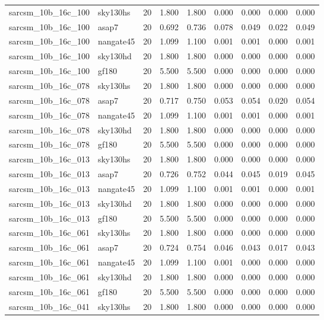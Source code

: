 \begin{tabular}{llrrrrrrr}
sarcsm\_10b\_16c\_100 & sky130hs & 20 & 1.800 & 1.800 & 0.000 & 0.000 & 0.000 & 0.000 \\
sarcsm\_10b\_16c\_100 & asap7 & 20 & 0.692 & 0.736 & 0.078 & 0.049 & 0.022 & 0.049 \\
sarcsm\_10b\_16c\_100 & nangate45 & 20 & 1.099 & 1.100 & 0.001 & 0.001 & 0.000 & 0.001 \\
sarcsm\_10b\_16c\_100 & sky130hd & 20 & 1.800 & 1.800 & 0.000 & 0.000 & 0.000 & 0.000 \\
sarcsm\_10b\_16c\_100 & gf180 & 20 & 5.500 & 5.500 & 0.000 & 0.000 & 0.000 & 0.000 \\
sarcsm\_10b\_16c\_078 & sky130hs & 20 & 1.800 & 1.800 & 0.000 & 0.000 & 0.000 & 0.000 \\
sarcsm\_10b\_16c\_078 & asap7 & 20 & 0.717 & 0.750 & 0.053 & 0.054 & 0.020 & 0.054 \\
sarcsm\_10b\_16c\_078 & nangate45 & 20 & 1.099 & 1.100 & 0.001 & 0.001 & 0.000 & 0.001 \\
sarcsm\_10b\_16c\_078 & sky130hd & 20 & 1.800 & 1.800 & 0.000 & 0.000 & 0.000 & 0.000 \\
sarcsm\_10b\_16c\_078 & gf180 & 20 & 5.500 & 5.500 & 0.000 & 0.000 & 0.000 & 0.000 \\
sarcsm\_10b\_16c\_013 & sky130hs & 20 & 1.800 & 1.800 & 0.000 & 0.000 & 0.000 & 0.000 \\
sarcsm\_10b\_16c\_013 & asap7 & 20 & 0.726 & 0.752 & 0.044 & 0.045 & 0.019 & 0.045 \\
sarcsm\_10b\_16c\_013 & nangate45 & 20 & 1.099 & 1.100 & 0.001 & 0.001 & 0.000 & 0.001 \\
sarcsm\_10b\_16c\_013 & sky130hd & 20 & 1.800 & 1.800 & 0.000 & 0.000 & 0.000 & 0.000 \\
sarcsm\_10b\_16c\_013 & gf180 & 20 & 5.500 & 5.500 & 0.000 & 0.000 & 0.000 & 0.000 \\
sarcsm\_10b\_16c\_061 & sky130hs & 20 & 1.800 & 1.800 & 0.000 & 0.000 & 0.000 & 0.000 \\
sarcsm\_10b\_16c\_061 & asap7 & 20 & 0.724 & 0.754 & 0.046 & 0.043 & 0.017 & 0.043 \\
sarcsm\_10b\_16c\_061 & nangate45 & 20 & 1.099 & 1.100 & 0.001 & 0.000 & 0.000 & 0.000 \\
sarcsm\_10b\_16c\_061 & sky130hd & 20 & 1.800 & 1.800 & 0.000 & 0.000 & 0.000 & 0.000 \\
sarcsm\_10b\_16c\_061 & gf180 & 20 & 5.500 & 5.500 & 0.000 & 0.000 & 0.000 & 0.000 \\
sarcsm\_10b\_16c\_041 & sky130hs & 20 & 1.800 & 1.800 & 0.000 & 0.000 & 0.000 & 0.000 \\

\end{tabular}
